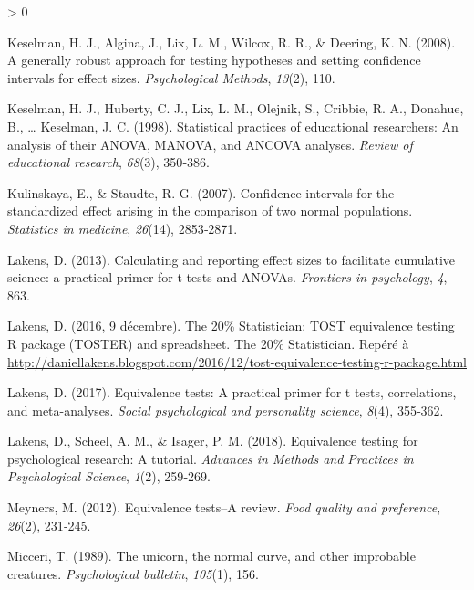 \documentclass[
  12pt,
  french,
]{article}
\newlength{\cslhangindent}
\newenvironment{CSLReferences}[2] %
 {%
  \setlength{\parindent}{0pt}
  \ifodd #1 \everypar{\setlength{\hangindent}{\cslhangindent}}\ignorespaces\fi
  \ifnum #2 > 0
  \setlength{\parskip}{#2\baselineskip}
  \fi
 }%
 {}
\begin{document}
\begin{CSLReferences}{1}{0}
\leavevmode\hypertarget{ref-keselman_generally_2008}{}%
Keselman, H. J., Algina, J., Lix, L. M., Wilcox, R. R., \& Deering, K.
N. (2008). A generally robust approach for testing hypotheses and
setting confidence intervals for effect sizes. \emph{Psychological
Methods}, \emph{13}(2), 110.

\leavevmode\hypertarget{ref-keselman_statistical_1998}{}%
Keselman, H. J., Huberty, C. J., Lix, L. M., Olejnik, S., Cribbie, R.
A., Donahue, B., \ldots{} Keselman, J. C. (1998). Statistical practices
of educational researchers: An analysis of their {ANOVA}, {MANOVA}, and
{ANCOVA} analyses. \emph{Review of educational research}, \emph{68}(3),
350‑386.

\leavevmode\hypertarget{ref-kulinskaya_confidence_2007}{}%
Kulinskaya, E., \& Staudte, R. G. (2007). Confidence intervals for the
standardized effect arising in the comparison of two normal populations.
\emph{Statistics in medicine}, \emph{26}(14), 2853‑2871.

\leavevmode\hypertarget{ref-lakens_calculating_2013}{}%
Lakens, D. (2013). Calculating and reporting effect sizes to facilitate
cumulative science: a practical primer for t-tests and {ANOVAs}.
\emph{Frontiers in psychology}, \emph{4}, 863.

\leavevmode\hypertarget{ref-lakens_20_2016}{}%
Lakens, D. (2016, 9 décembre). The 20\% Statistician: {TOST} equivalence
testing R package ({TOSTER}) and spreadsheet. The 20\% Statistician.
Repéré à
\url{http://daniellakens.blogspot.com/2016/12/tost-equivalence-testing-r-package.html}

\leavevmode\hypertarget{ref-lakens_equivalence_2017}{}%
Lakens, D. (2017). Equivalence tests: A practical primer for t tests,
correlations, and meta-analyses. \emph{Social psychological and
personality science}, \emph{8}(4), 355‑362.

\leavevmode\hypertarget{ref-lakens_equivalence_2018}{}%
Lakens, D., Scheel, A. M., \& Isager, P. M. (2018). Equivalence testing
for psychological research: A tutorial. \emph{Advances in Methods and
Practices in Psychological Science}, \emph{1}(2), 259‑269.

\leavevmode\hypertarget{ref-meyners_equivalence_2012}{}%
Meyners, M. (2012). Equivalence tests--A review. \emph{Food quality and
preference}, \emph{26}(2), 231‑245.

\leavevmode\hypertarget{ref-micceri_unicorn_1989}{}%
Micceri, T. (1989). The unicorn, the normal curve, and other improbable
creatures. \emph{Psychological bulletin}, \emph{105}(1), 156.


\end{CSLReferences}
\end{document}
